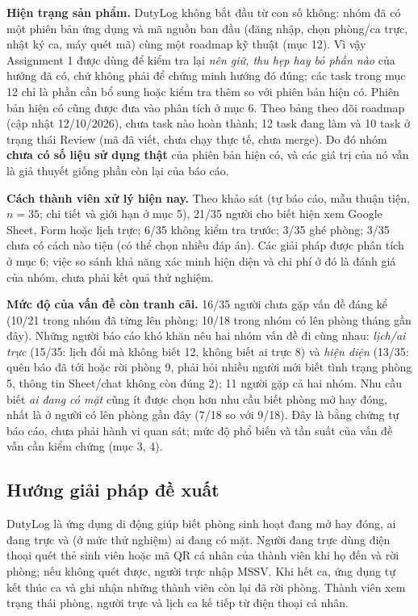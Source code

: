 \textbf{Hiện trạng sản phẩm.} DutyLog không bắt đầu từ con số không: nhóm đã có một phiên bản ứng dụng và mã nguồn ban đầu (đăng nhập, chọn phòng/ca trực, nhật ký ca, máy quét mã) cùng một roadmap kỹ thuật (mục 12). Vì vậy Assignment 1 được dùng để kiểm tra lại \emph{nên giữ, thu hẹp hay bỏ phần nào} của hướng đã có, chứ không phải để chứng minh hướng đó đúng; các task trong mục 12 chỉ là phần cần bổ sung hoặc kiểm tra thêm so với phiên bản hiện có. Phiên bản hiện có cũng được đưa vào phân tích ở mục 6.
Theo bảng theo dõi roadmap (cập nhật 12/10/2026), chưa task nào hoàn thành; 12 task đang làm và 10 task ở trạng thái Review (mã đã viết, chưa chạy thực tế, chưa merge). Do đó nhóm \textbf{chưa có số liệu sử dụng thật} của phiên bản hiện có, và các giá trị của nó vẫn là giả thuyết giống phần còn lại của báo cáo.

\textbf{Cách thành viên xử lý hiện nay.} Theo khảo sát (tự báo cáo, mẫu thuận tiện, $n=35$; chi tiết và giới hạn ở mục 5), 21/35 người cho biết hiện xem Google Sheet, Form hoặc lịch trực; 6/35 không kiểm tra trước; 3/35 ghé phòng; 3/35 chưa có cách nào tiện (có thể chọn nhiều đáp án). Các giải pháp được phân tích ở mục 6; việc so sánh khả năng xác minh hiện diện và chi phí ở đó là đánh giá của nhóm, chưa phải kết quả thử nghiệm.

\textbf{Mức độ của vấn đề còn tranh cãi.} 16/35 người chưa gặp vấn đề đáng kể (10/21 trong nhóm đã từng lên phòng; 10/18 trong nhóm có lên phòng tháng gần đây). Những người báo cáo khó khăn nêu hai nhóm vấn đề đi cùng nhau: \emph{lịch/ai trực} (15/35: lịch đổi mà không biết 12, không biết ai trực 8) và \emph{hiện diện} (13/35: quên báo đã tới hoặc rời phòng 9, phải hỏi nhiều người mới biết tình trạng phòng 5, thông tin Sheet/chat không còn đúng 2); 11 người gặp cả hai nhóm. Nhu cầu biết \emph{ai đang có mặt} cũng ít được chọn hơn nhu cầu biết phòng mở hay đóng, nhất là ở người có lên phòng gần đây (7/18 so với 9/18). Đây là bằng chứng tự báo cáo, chưa phải hành vi quan sát; mức độ phổ biến và tần suất của vấn đề vẫn cần kiểm chứng (mục 3, 4).

\subsection{Hướng giải pháp đề xuất}
DutyLog là ứng dụng di động giúp biết phòng sinh hoạt đang mở hay đóng, ai đang trực và (ở mức thử nghiệm) ai đang có mặt. Người đang trực dùng điện thoại quét thẻ sinh viên hoặc mã QR cá nhân của thành viên khi họ đến và rời phòng; nếu không quét được, người trực nhập MSSV. Khi hết ca, ứng dụng tự kết thúc ca và ghi nhận những thành viên còn lại đã rời phòng. Thành viên xem trạng thái phòng, người trực và lịch ca kế tiếp từ điện thoại cá nhân.

